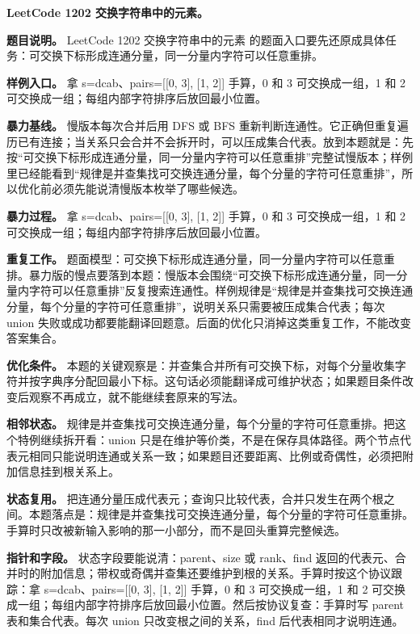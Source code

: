 \noindent\textbf{LeetCode 1202 交换字符串中的元素。}

\textbf{题目说明。} LeetCode 1202 交换字符串中的元素 的题面入口要先还原成具体任务：可交换下标形成连通分量，同一分量内字符可以任意重排。

\textbf{样例入口。} 拿 s=dcab、pairs=[[0, 3], [1, 2]] 手算，0 和 3 可交换成一组，1 和 2 可交换成一组；每组内部字符排序后放回最小位置。

\textbf{暴力基线。} 慢版本每次合并后用 DFS 或 BFS 重新判断连通性。它正确但重复遍历已有连接；当关系只会合并不会拆开时，可以压成集合代表。放到本题就是：先按“可交换下标形成连通分量，同一分量内字符可以任意重排”完整试慢版本；样例里已经能看到“规律是并查集找可交换连通分量，每个分量的字符可任意重排”，所以优化前必须先能说清慢版本枚举了哪些候选。

\textbf{暴力过程。} 拿 s=dcab、pairs=[[0, 3], [1, 2]] 手算，0 和 3 可交换成一组，1 和 2 可交换成一组；每组内部字符排序后放回最小位置。

\textbf{重复工作。} 题面模型：可交换下标形成连通分量，同一分量内字符可以任意重排。暴力版的慢点要落到本题：慢版本会围绕“可交换下标形成连通分量，同一分量内字符可以任意重排”反复搜索连通性。样例规律是“规律是并查集找可交换连通分量，每个分量的字符可任意重排”，说明关系只需要被压成集合代表；每次 union 失败或成功都要能翻译回题意。后面的优化只消掉这类重复工作，不能改变答案集合。

\textbf{优化条件。} 本题的关键观察是：并查集合并所有可交换下标，对每个分量收集字符并按字典序分配回最小下标。这句话必须能翻译成可维护状态；如果题目条件改变后观察不再成立，就不能继续套原来的写法。

\textbf{相邻状态。} 规律是并查集找可交换连通分量，每个分量的字符可任意重排。把这个特例继续拆开看：union 只是在维护等价类，不是在保存具体路径。两个节点代表元相同只能说明连通或关系一致；如果题目还要距离、比例或奇偶性，必须把附加信息挂到根关系上。

\textbf{状态复用。} 把连通分量压成代表元；查询只比较代表，合并只发生在两个根之间。本题落点是：规律是并查集找可交换连通分量，每个分量的字符可任意重排。手算时只改被新输入影响的那一小部分，而不是回头重算完整候选。

\textbf{指针和字段。} 状态字段要能说清：parent、size 或 rank、find 返回的代表元、合并时的附加信息；带权或奇偶并查集还要维护到根的关系。手算时按这个协议跟踪：拿 s=dcab、pairs=[[0, 3], [1, 2]] 手算，0 和 3 可交换成一组，1 和 2 可交换成一组；每组内部字符排序后放回最小位置。然后按协议复查：手算时写 parent 表和集合代表。每次 union 只改变根之间的关系，find 后代表相同才说明连通。

